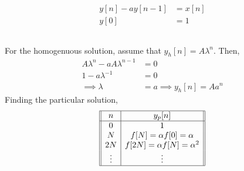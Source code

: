 \documentclass{article}
\begin{document}
\section{}

\begin{align}
    y[n] - ay[n - 1] &= x[n] \\
    y[0] &= 1
\end{align}

\subsection{}

For the homogenuous solution, assume that \(y_h[n] = A\lambda^n\).
Then,
\begin{align}
    A\lambda^n - aA\lambda^{n - 1} &= 0 \\
    1 - a\lambda^{-1} &= 0 \\
    \implies \lambda &= a
    \implies y_h[n] = Aa^n
\end{align}
Finding the particular solution,
\begin{equation}
    \begin{array}[]{||c|c||}
        \hline
        n & y_p[n] \\
        \hline
        0 & 1 \\
        N & f[N] = \alpha f[0] = \alpha \\
        2N & f[2N] = \alpha f[N] = \alpha^2 \\
        \vdots & \vdots \\
        \hline
    \end{array}
\end{equation}
\end{document}
